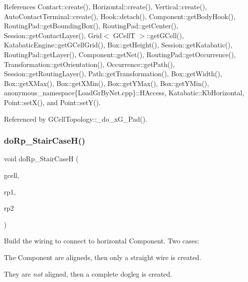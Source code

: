 References Contact\+::create(), Horizontal\+::create(), Vertical\+::create(), Auto\+Contact\+Terminal\+::create(), Hook\+::detach(), Component\+::get\+Body\+Hook(), Routing\+Pad\+::get\+Bounding\+Box(), Routing\+Pad\+::get\+Center(), Session\+::get\+Contact\+Layer(), Grid$<$ G\+Cell\+T $>$\+::get\+G\+Cell(), Katabatic\+Engine\+::get\+G\+Cell\+Grid(), Box\+::get\+Height(), Session\+::get\+Katabatic(), Routing\+Pad\+::get\+Layer(), Component\+::get\+Net(), Routing\+Pad\+::get\+Occurrence(), Transformation\+::get\+Orientation(), Occurrence\+::get\+Path(), Session\+::get\+Routing\+Layer(), Path\+::get\+Transformation(), Box\+::get\+Width(), Box\+::get\+X\+Max(), Box\+::get\+X\+Min(), Box\+::get\+Y\+Max(), Box\+::get\+Y\+Min(), anonymous\+\_\+namespace\{\+Load\+Gr\+By\+Net.\+cpp\}\+::\+H\+Access, Katabatic\+::\+Kb\+Horizontal, Point\+::set\+X(), and Point\+::set\+Y().



Referenced by G\+Cell\+Topology\+::\+\_\+do\+\_\+x\+G\+\_\+Pad().

\mbox{\label{group__LoadGlobalRouting_ga3291d84592215974fe4052c00304bdb1}} 
\subsubsection{\texorpdfstring{do\+Rp\+\_\+\+Stair\+Case\+H()}{doRp\_StairCaseH()}}
{\footnotesize\ttfamily void do\+Rp\+\_\+\+Stair\+CaseH (\begin{DoxyParamCaption}\item[{\mbox{\hyperlink{classKatabatic_1_1GCell}{G\+Cell}} $\ast$}]{gcell,  }\item[{\textbf{ Component} $\ast$}]{rp1,  }\item[{\textbf{ Component} $\ast$}]{rp2 }\end{DoxyParamCaption})\hspace{0.3cm}{\ttfamily [static]}}

Build the wiring to connect to horizontal Component. Two cases\+:
\begin{DoxyItemize}
\item The Component are aligneds, then only a straight wire is created.
\item They are {\itshape not} aligned, then a complete dogleg is created.
\end{DoxyItemize}

